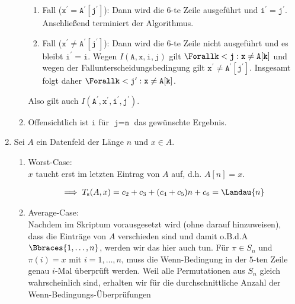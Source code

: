 \begin{solution}
\begin{enumerate}[label = (\alph*)]
\begin{enumerate}[label = \arabic*.]
    \begin{enumerate}[label = \Roman*.]
      
      \item Fall ($\texttt{x}^\prime = \texttt{A}^\prime[\texttt{j}^\prime]$):
      Dann wird die $6$-te Zeile ausgeführt und $\texttt{i}^\prime = \texttt{j}^\prime$.
      Anschließend terminiert der Algorithmus.

      \item Fall ($\texttt{x}^\prime \neq \texttt{A}^\prime[\texttt{j}^\prime]$):
      Dann wird die $6$-te Zeile nicht ausgeführt und es bleibt $\texttt{i}^\prime = \texttt{i}$.
      Wegen $I(\texttt{A}, \texttt{x}, \texttt{i}, \texttt{j})$ gilt $\Forall \texttt{k} < \texttt{j}: \texttt{x} \neq \texttt{A}[\texttt{k}]$ und wegen der Fallunterscheidungsbedingung gilt $\texttt{x}^\prime \neq \texttt{A}^\prime[\texttt{j}^\prime]$.
      Insgesamt folgt daher $\Forall \texttt{k} < \texttt{j}^\prime: \texttt{x} \neq \texttt{A}[\texttt{k}]$.
    \end{enumerate}

    Also gilt auch $I(\texttt{A}^\prime, \texttt{x}^\prime, \texttt{i}^\prime, \texttt{j}^\prime)$.

    \item Offensichtlich ist $\texttt{i}$ für $\texttt{j} = \texttt{n}$ das gewünschte Ergebnis.

  \end{enumerate}

  \item Sei $A$ ein Datenfeld der Länge $n$ und $x \in A$.

  \begin{enumerate}[label = \arabic*.]

    \item Worst-Case: \\
    $x$ taucht erst im letzten Eintrag von $A$ auf, d.h. $A[n] = x$.

    \begin{align*}
      \implies
      T_{\mathrm{s}}(A, x)
      =
      c_2 + c_3 + (c_4 + c_5) n + c_6
      =
      \Landau{n}
    \end{align*}
  
    \item Average-Case: \\
    Nachdem im Skriptum vorausgesetzt wird (ohne darauf hinzuweisen), dass die Einträge von $A$ verschieden sind und damit o.B.d.A $\Bbraces{1, \dots, n}$, werden wir das hier auch tun.
    Für $\pi \in S_n$ und $\pi(i) = x$ mit $i = 1, \dots, n$, muss die Wenn-Bedingung in der $5$-ten Zeile genau $i$-Mal überprüft werden.
    Weil alle Permutationen aus $S_n$ gleich wahrscheinlich sind, erhalten wir für die durchschnittliche Anzahl der Wenn-Bedingungs-Überprüfungen
    

\end{enumerate}
\end{enumerate}
\end{solution}
